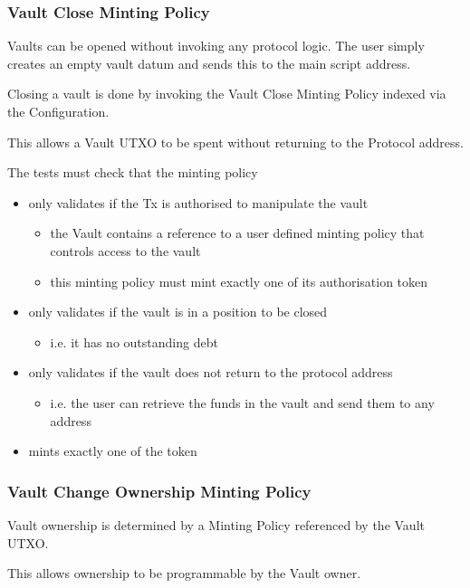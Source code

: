 \documentclass{article} %
\begin{document}
\subsubsection{Vault Close Minting Policy}
Vaults can be opened without invoking any protocol logic. The user simply creates an empty vault datum and sends this to the main script address.

Closing a vault is done by invoking the Vault Close Minting Policy indexed via the Configuration.

This allows a Vault UTXO to be spent without returning to the Protocol address.

The tests must check that the minting policy
\begin{itemize}
  \item only validates if the Tx is authorised to manipulate the vault
  \begin{itemize}
    \item the Vault contains a reference to a user defined minting policy that controls access to the vault
    \item this minting policy must mint exactly one of its authorisation token
  \end{itemize}
  \item only validates if the vault is in a position to be closed
  \begin{itemize}
    \item i.e. it has no outstanding debt
  \end{itemize}
  \item only validates if the vault does not return to the protocol address
  \begin{itemize}
    \item i.e. the user can retrieve the funds in the vault and send them to any address
  \end{itemize}
  \item mints exactly one of the token
\end{itemize}

\subsubsection{Vault Change Ownership Minting Policy}
Vault ownership is determined by a Minting Policy referenced by the Vault UTXO.

This allows ownership to be programmable by the Vault owner.
\end{document}
